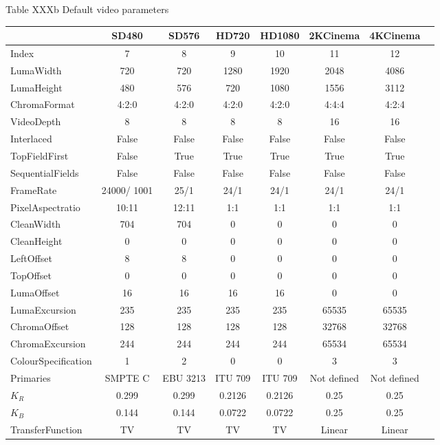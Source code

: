 Table XXXb Default video parameters


\begin{tabular}{|l|c|c|c|c|c|c|c|}
\hline
&SD480&SD576&HD720&HD1080&2KCinema&4KCinema\\
\hline
Index&7&8&9&10&11&12\\
\hline
LumaWidth&720&720&1280&1920&2048&4086\\
LumaHeight&480&576&720&1080&1556&3112\\
ChromaFormat&4:2:0&4:2:0&4:2:0&4:2:0&4:4:4&4:2:4\\
VideoDepth&8&8&8&8&16&16\\
Interlaced&False&False&False&False&False&False\\
TopFieldFirst&False&True&True&True&True&True\\
SequentialFields&False&False&False&False&False&False\\
FrameRate&24000/
1001&25/1&24/1&24/1&24/1&24/1\\
PixelAspectratio&10:11&12:11&1:1&1:1&1:1&1:1\\
CleanWidth&704&704&0&0&0&0\\
CleanHeight&0&0&0&0&0&0\\
LeftOffset&8&8&0&0&0&0\\
TopOffset&0&0&0&0&0&0\\
LumaOffset&16&16&16&16&0&0\\
LumaExcursion&235&235&235&235&65535&65535\\
ChromaOffset&128&128&128&128&32768&32768\\
ChromaExcursion&244&244&244&244&65534&65534\\
ColourSpecification&1&2&0&0&3&3\\
Primaries&SMPTE C&EBU 3213&ITU 709&ITU 709&Not defined&Not defined\\
$K_{R}$&0.299&0.299&0.2126&0.2126&0.25&0.25\\
$K_{B}$&0.144&0.144&0.0722&0.0722&0.25&0.25\\
TransferFunction&TV&TV&TV&TV&Linear&Linear\\
\hline
\end{tabular}
